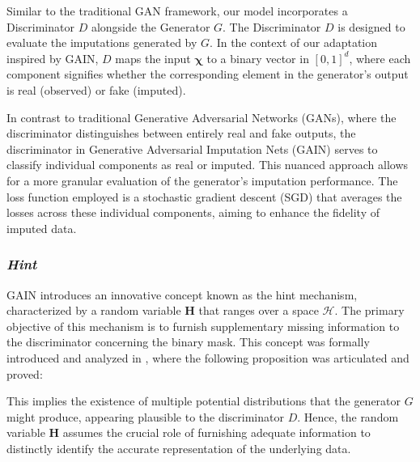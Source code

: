 Similar to the traditional GAN framework, our model incorporates a Discriminator \( D \) alongside the Generator \( G \). The Discriminator \( D \) is designed to evaluate the imputations generated by \( G \). In the context of our adaptation inspired by GAIN, \( D \) maps the input \( \mathbf{\chi} \) to a binary vector in \( [0,1]^d \), where each component signifies whether the corresponding element in the generator's output is real (observed) or fake (imputed).

In contrast to traditional Generative Adversarial Networks (GANs), where the discriminator distinguishes between entirely real and fake outputs, the discriminator in Generative Adversarial Imputation Nets (GAIN) serves to classify individual components as real or imputed. This nuanced approach allows for a more granular evaluation of the generator's imputation performance. The loss function employed is a stochastic gradient descent (SGD) that averages the losses across these individual components, aiming to enhance the fidelity of imputed data.


\subsubsection{\textit{Hint}}
GAIN introduces an innovative concept known as the hint mechanism, characterized by a random variable \( \mathbf{H} \) that ranges over a space \( \mathcal{H} \). The primary objective of this mechanism is to furnish supplementary missing information to the discriminator concerning the binary mask. This concept was formally introduced and analyzed in \cite{gain}, where the following proposition was articulated and proved:

This implies the existence of multiple potential distributions that the generator \( G \) might produce, appearing plausible to the discriminator \( D \). Hence, the random variable \( \mathbf{H} \) assumes the crucial role of furnishing adequate information to distinctly identify the accurate representation of the underlying data.

